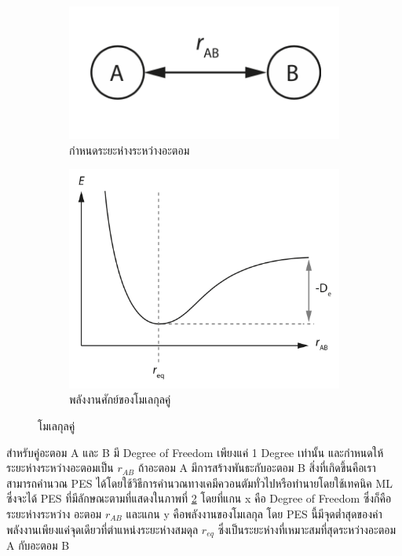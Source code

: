 \begin{figure}[htbp]
    \centering
    \begin{subfigure}{0.5\textwidth}
        \centering
        \includegraphics[width=0.9\linewidth]{fig/diatomic_molecule.png}
        \caption{กำหนดระยะห่างระหว่างอะตอม}
        \label{fig:diatomic_mol}
    \end{subfigure}%
    \begin{subfigure}{0.5\textwidth}
        \centering
        \includegraphics[width=0.9\linewidth]{fig/PES_diatomic_mol.png}
        \caption{พลังงานศักย์ของโมเลกุลคู่}
        \label{fig:PES_diatomic}
    \end{subfigure}
    \caption{โมเลกุลคู่}
    \label{fig:diatomic_mol_and_PES}
\end{figure}

สำหรับคู่อะตอม A และ B มี Degree of Freedom เพียงแค่ 1 Degree เท่านั้น และกำหนดให้ระยะห่างระหว่างอะตอมเป็น $r_{AB}$ ถ้าอะตอม
A มีการสร้างพันธะกับอะตอม B สิ่งที่เกิดขึ้นคือเราสามารถคำนวณ PES ได้โดยใช้วิธีการคำนวณทางเคมีควอนตัมทั่วไปหรือทำนายโดยใช้เทคนิค ML
ซึ่งจะได้ PES ที่มีลักษณะตามที่แสดงในภาพที่ \ref{fig:PES_diatomic} โดยที่แกน x คือ Degree of Freedom ซึ่งก็คือระยะห่างระหว่าง%
อะตอม $r_{AB}$ และแกน y คือพลังงานของโมเลกุล โดย PES นี้มีจุดต่ำสุดของค่าพลังงานเพียงแค่จุดเดียวที่ตำแหน่งระยะห่างสมดุล $r_{eq}$
ซึ่งเป็นระยะห่างที่เหมาะสมที่สุดระหว่างอะตอม A กับอะตอม B

